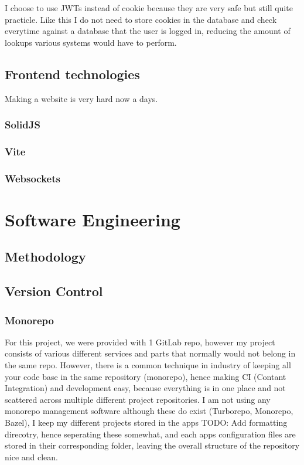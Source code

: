 \documentclass[titlepage]{article}
\begin{document}
I choose to use JWTs instead of cookie because they are very safe but still quite practicle. Like this I do not need to store cookies in the database and check everytime against a database that the user is logged in, reducing the amount of lookups various systems would have to perform.

\subsection{Frontend technologies}
Making a website is very hard now a days.

\subsubsection{SolidJS}

\subsubsection{Vite}

\subsubsection{Websockets}

\section{Software Engineering}

\subsection{Methodology}

\subsection{Version Control}

\subsubsection{Monorepo}
For this project, we were provided with 1 GitLab repo, however my project consists of various different services and parts that normally would not belong in the same repo. However, there is a common technique in industry of keeping all your code base in the same repository (monorepo), hence making CI (Contant Integration) and development easy, because everything is in one place and not scattered across multiple different project repositories. I am not using any monorepo management software although these do exist (Turborepo, Monorepo, Bazel), I keep my different projects stored in the apps TODO: Add formatting direcotry, hence seperating these somewhat, and each apps configuration files are stored in their corresponding folder, leaving the overall structure of the repository nice and clean.
\end{document}
